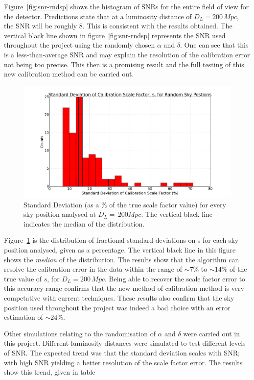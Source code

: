\documentclass[12pt]{iopart}
\begin{document}
Figure~\ref{fig:snr-rndsp} shows the histogram of SNRs for the entire field of
view for the detector. Predictions state that at a luminosity distance of
$D_{L}=200\,Mpc$, the SNR will be roughly 8. This is consistent with the
results obtained. The vertical black line shown in figure~\ref{fig:snr-rndsp}
represents the SNR used throughout the project using the randomly chosen
$\alpha$ and $\delta$. One can see that this is a less-than-average SNR and may
explain the resolution of the calibration error not being too precise. This
then is a promising result and the full testing of this new calibration method
can be carried out.


\begin{figure}
  \centering
  \includegraphics[width=\textwidth]{rand_sp_std_D200}
  \caption{Standard Deviation (as a $\%$ of the true scale factor
value) for every sky position analysed at $D_{L}=\,200Mpc$. The vertical black
line indicates the median of the distribution.}
  \label{fig:std-rndsp}
\end{figure}



Figure~\ref{fig:std-rndsp} is the distribution of fractional standard
deviations on s for each sky position analysed, given as a percentage. The
vertical black line in this figure shows the \textit{median} of the
distribution. The results show that the algorithm can resolve the calibration
error in the data within the range of $\sim 7\%$ to $\sim 14\%$ of the true
value of $s$, for $D_{L}=200\,Mpc$. Being able to recover the scale factor
error to this accuracy range confirms that the new method of calibration method
is very competative with current techniques. These results also confirm that
the sky position used throughout the project was indeed a bad choice with an
error estimation of $\sim 24\%$.


Other simulations relating to the randomisation of $\alpha$ and $\delta$ were
carried out in this project. Different luminosity distances were simulated to
test different levels of SNR. The expected trend was that the standard
deviation scales with SNR; with high SNR yielding a better resolution of the
scale factor error. The results show this trend, given in table
\end{document}
